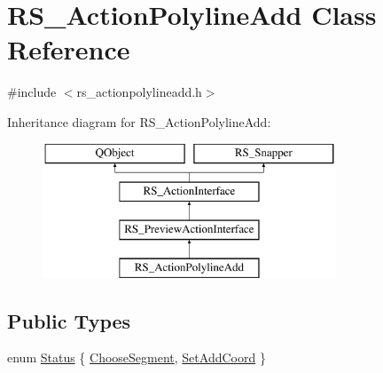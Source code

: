 \hypertarget{classRS__ActionPolylineAdd}{\section{R\-S\-\_\-\-Action\-Polyline\-Add Class Reference}
\label{classRS__ActionPolylineAdd}
}


{\ttfamily \#include $<$rs\-\_\-actionpolylineadd.\-h$>$}

Inheritance diagram for R\-S\-\_\-\-Action\-Polyline\-Add\-:\begin{figure}[H]
\begin{center}
\leavevmode
\includegraphics[height=4.000000cm]{classRS__ActionPolylineAdd}
\end{center}
\end{figure}
\subsection*{Public Types}
\begin{DoxyCompactItemize}
\item 
enum \hyperlink{classRS__ActionPolylineAdd_a308fb4151994757401d605f4e43c9bad}{Status} \{ \hyperlink{classRS__ActionPolylineAdd_a308fb4151994757401d605f4e43c9badab487b856c111389881bf82d1e7360753}{Choose\-Segment}, 
\hyperlink{classRS__ActionPolylineAdd_a308fb4151994757401d605f4e43c9bada756bec60664d9551aaf8f42b4f6f32d3}{Set\-Add\-Coord}
 \}
\end{DoxyCompactItemize}
